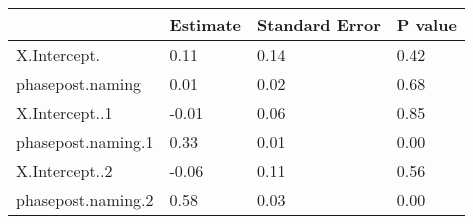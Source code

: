 


\begin{table}[tbp]

\begin{center}
\begin{threeparttable}

\begin{tabular}{llll}
\toprule
 & \multicolumn{1}{c}{Estimate} & \multicolumn{1}{c}{Standard Error} & \multicolumn{1}{c}{P value}\\
\midrule
X.Intercept. & 0.11 & 0.14 & 0.42\\
phasepost.naming & 0.01 & 0.02 & 0.68\\
X.Intercept..1 & -0.01 & 0.06 & 0.85\\
phasepost.naming.1 & 0.33 & 0.01 & 0.00\\
X.Intercept..2 & -0.06 & 0.11 & 0.56\\
phasepost.naming.2 & 0.58 & 0.03 & 0.00\\
\bottomrule
\end{tabular}

\end{threeparttable}
\end{center}

\end{table}



